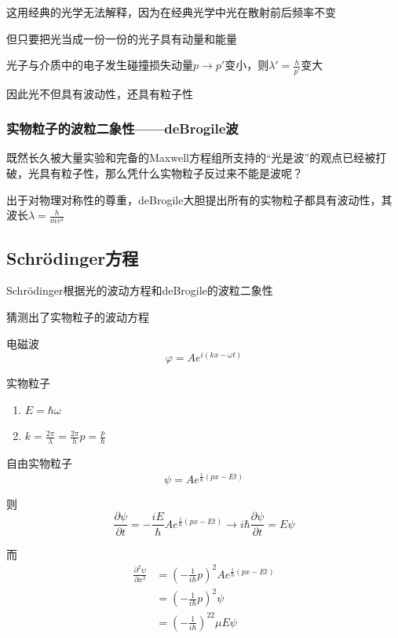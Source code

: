 \documentclass[lang=cn,10pt]{elegantbook}
\begin{document}
这用经典的光学无法解释，因为在经典光学中光在散射前后频率不变

但只要把光当成一份一份的光子具有动量和能量

光子与介质中的电子发生碰撞损失动量$p\rightarrow p'$变小，则$\lambda'=\frac{h}{p'}$变大

因此光不但具有波动性，还具有粒子性

\subsubsection{实物粒子的波粒二象性——deBrogile波}
既然长久被大量实验和完备的Maxwell方程组所支持的“光是波”的观点已经被打破，光具有粒子性，那么凭什么实物粒子反过来不能是波呢？

出于对物理对称性的尊重，deBrogile大胆提出所有的实物粒子都具有波动性，其波长$
\lambda=\frac{h}{mv^2}$
\subsection{Schrödinger方程}
Schrödinger根据光的波动方程和deBrogile的波粒二象性

猜测出了实物粒子的波动方程

电磁波
\begin{equation}
	\varphi =Ae^{i\left( kx-\omega t \right)}
\end{equation}

实物粒子
\begin{enumerate}
	\item $E=\hbar\omega$
	\item $k=\frac{2\pi}{\lambda}=\frac{2\pi}{h}p=\frac{p}{\hbar}$
\end{enumerate}

自由实物粒子
\begin{equation}
	\psi =Ae^{\frac{i}{\hbar}\left( px-Et \right)}
\end{equation}

则
\begin{equation}
	\frac{\partial \psi}{\partial t}=-\frac{iE}{\hbar}Ae^{\frac{i}{\hbar}\left( px-Et \right)}\rightarrow i\hbar \frac{\partial \psi}{\partial t}=E\psi 
\end{equation}

而
\begin{equation}
	\begin{split}
		\frac{\partial ^2\psi}{\partial x^2}&=\left( -\frac{1}{i\hbar}p \right) ^2Ae^{\frac{i}{\hbar}\left( px-Et \right)}
		\\
		&=\left( -\frac{1}{i\hbar}p \right) ^2\psi 
		\\
		&=\left( -\frac{1}{i\hbar} \right) ^22\mu E\psi 
	\end{split}
\end{equation}
\end{document}
